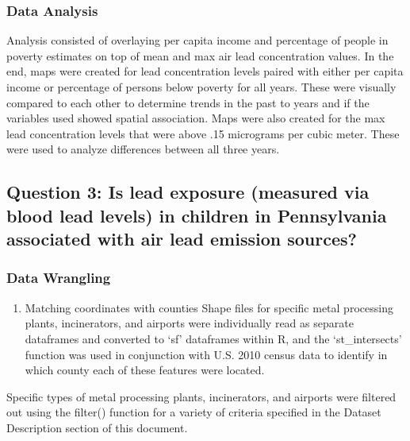\documentclass[
  12pt,
]{article}
\providecommand{\tightlist}{%
  \setlength{\itemsep}{0pt}\setlength{\parskip}{0pt}}
\begin{document}
\hypertarget{data-analysis-1}{%
\subsubsection{Data Analysis}\label{data-analysis-1}}

Analysis consisted of overlaying per capita income and percentage of
people in poverty estimates on top of mean and max air lead
concentration values. In the end, maps were created for lead
concentration levels paired with either per capita income or percentage
of persons below poverty for all years. These were visually compared to
each other to determine trends in the past to years and if the variables
used showed spatial association. Maps were also created for the max lead
concentration levels that were above .15 micrograms per cubic meter.
These were used to analyze differences between all three years.

\hypertarget{question-3-is-lead-exposure-measured-via-blood-lead-levels-in-children-in-pennsylvania-associated-with-air-lead-emission-sources}{%
\subsection{Question 3: Is lead exposure (measured via blood lead
levels) in children in Pennsylvania associated with air lead emission
sources?}\label{question-3-is-lead-exposure-measured-via-blood-lead-levels-in-children-in-pennsylvania-associated-with-air-lead-emission-sources}}

\hypertarget{data-wrangling-1}{%
\subsubsection{Data Wrangling}\label{data-wrangling-1}}

\begin{enumerate}
\def\labelenumi{\arabic{enumi}.}
\tightlist
\item
  Matching coordinates with counties Shape files for specific metal
  processing plants, incinerators, and airports were individually read
  as separate dataframes and converted to `sf' dataframes within R, and
  the `st\_intersects' function was used in conjunction with U.S. 2010
  census data to identify in which county each of these features were
  located.
\end{enumerate}

Specific types of metal processing plants, incinerators, and airports
were filtered out using the filter() function for a variety of criteria
specified in the Dataset Description section of this document.
\end{document}
